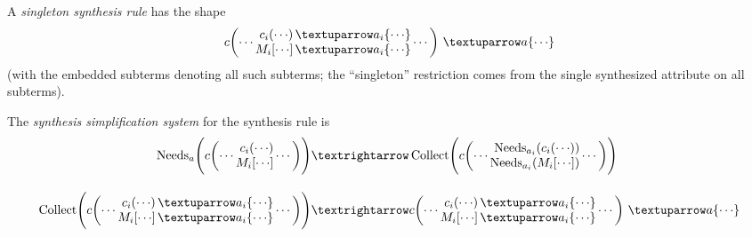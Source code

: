 \documentclass[letterpaper,11pt]{article}
\begin{document}
\begin{definition}\label{def:synth}%
  A \emph{singleton synthesis rule} has the shape
  \begin{displaymath}
    c\biggl(\cdots \vcenter{\txt{
          $c_i({\cdots})\,{{↑}a_i\{{\cdots}\}}$\\
          $M_i[{\cdots}]\,{{↑}a_i\{{\cdots}\}}$
        }}\cdots\biggr)
    ~{{↑}a\{{\cdots}\}}
  \end{displaymath}
  (with the embedded subterms denoting all such subterms; the ``singleton'' restriction comes from
  the single synthesized attribute on all subterms).

  The \emph{synthesis simplification system} for the synthesis rule is
  \begin{align*}
    \op{Needs}_a\Biggl(
    c\biggl(\cdots \vcenter{\txt{
        $c_i({\cdots})$\\
        $M_i[{\cdots}]$
      }}\cdots\biggr)
    \Biggr)
    &→
    \op{Collect}\Biggl(
    c\biggl(\cdots \vcenter{\txt{
        $\op{Needs}_{{a_i}}(c_i({\cdots}))$\\
        $\op{Needs}_{{a_i}}(M_i[{\cdots}])$
      }}\cdots\biggr)    
    \Biggr)
    \\[1em]
    \op{Collect}\Biggl(
    c\biggl(\cdots \vcenter{\txt{
          $c_i({\cdots})\,{↑}a_i\{{\cdots}\}$\\
          $M_i[{\cdots}]\,{↑}a_i\{{\cdots}\}$
      }}\cdots\biggr)
    \Biggr)
    &→
    c\biggl(\cdots \vcenter{\txt{
          $c_i({\cdots})\,{↑}a_i\{{\cdots}\}$\\
          $M_i[{\cdots}]\,{↑}a_i\{{\cdots}\}$
        }}\cdots\biggr)
    ~{↑}a\{{\cdots}\}
  \end{align*}
\end{definition}

\begin{example}
\end{example}

\end{document}
